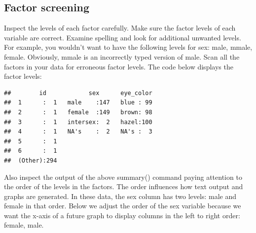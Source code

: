\documentclass[
]{krantz}
\makeatletter
\newenvironment{Shaded}{\begin{snugshade}}{\end{snugshade}}
\newcommand{\DataTypeTok}[1]{\textcolor[rgb]{0.27,0.27,0.27}{#1}}
\newcommand{\KeywordTok}[1]{\textcolor[rgb]{0.27,0.27,0.27}{\textbf{#1}}}
\newcommand{\NormalTok}[1]{#1}
\newcommand{\OperatorTok}[1]{\textcolor[rgb]{0.43,0.43,0.43}{\textbf{#1}}}
\newcommand{\StringTok}[1]{\textcolor[rgb]{0.5,0.5,0.5}{#1}}
\newenvironment{kframe}{%
\medskip{}
\setlength{\fboxsep}{.8em}
 \def\at@end@of@kframe{}%
 \ifinner\ifhmode%
  \def\at@end@of@kframe{\end{minipage}}%
  \begin{minipage}{\columnwidth}%
 \fi\fi%
 \def\FrameCommand##1{\hskip\@totalleftmargin \hskip-\fboxsep
 \colorbox{shadecolor}{##1}\hskip-\fboxsep
     \hskip-\linewidth \hskip-\@totalleftmargin \hskip\columnwidth}%
 \MakeFramed {\advance\hsize-\width
   \@totalleftmargin\z@ \linewidth\hsize
   \@setminipage}}%
 {\par\unskip\endMakeFramed%
 \at@end@of@kframe}
\renewenvironment{Shaded}{\begin{kframe}}{\end{kframe}}
\makeatother
\begin{document}
\hypertarget{factor-screening-3}{%
\subsection{Factor screening}\label{factor-screening-3}}

Inspect the levels of each factor carefully. Make sure the factor levels of each variable are correct. Examine spelling and look for additional unwanted levels. For example, you wouldn't want to have the following levels for sex: male, mmale, female. Obviously, mmale is an incorrectly typed version of male. Scan all the factors in your data for erroneous factor levels. The code below displays the factor levels:

\begin{Shaded}
\end{Shaded}

\begin{verbatim}
##        id            sex      eye_color  
##  1      :  1   male    :147   blue : 99  
##  2      :  1   female  :149   brown: 98  
##  3      :  1   intersex:  2   hazel:100  
##  4      :  1   NA's    :  2   NA's :  3  
##  5      :  1                             
##  6      :  1                             
##  (Other):294
\end{verbatim}

Also inspect the output of the above summary() command paying attention to the order of the levels in the factors. The order influences how text output and graphs are generated. In these data, the sex column has two levels: male and female in that order. Below we adjust the order of the sex variable because we want the x-axis of a future graph to display columns in the left to right order: female, male.

\begin{Shaded}
\end{Shaded}
\end{document}
